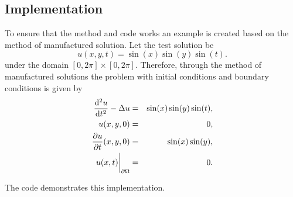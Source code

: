 \subsection{Implementation}
To ensure that the method and code works an example is created based on the method of manufactured solution. Let the test solution be
\begin{equation}
  u(x,y,t) = \sin(x)\sin(y)\sin(t).
\end{equation}
under the domain $[0,2\pi]\times[0,2\pi]$. Therefore, through the method of manufactured solutions the problem with initial conditions and boundary conditions is given by
\begin{eqnarray*}
  \frac{\mathop{}\!\mathrm{d}^2u}{\mathop{}\!\mathrm{d} t^2} - \Delta u & = & \sin(x)\sin(y)\sin(t), \\
  u(x,y,0) & = & 0, \\
  \frac{\partial u}{\partial t}(x,y,0) & = & \sin(x)\sin(y), \\
  u(x,t)\bigg|_{\partial\Omega} & = & 0.
\end{eqnarray*}

The code demonstrates this implementation.
